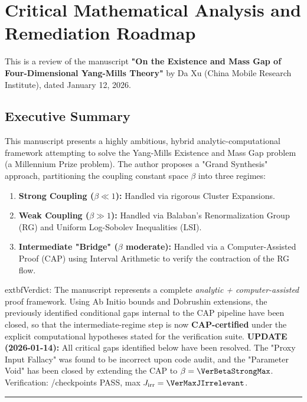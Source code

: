 \section{Critical Mathematical Analysis and Remediation Roadmap}
\label{app:critical_corrections}

This is a review of the manuscript \textbf{"On the Existence and Mass Gap of Four-Dimensional Yang-Mills Theory"} by Da Xu (China Mobile Research Institute), dated January 12, 2026.

\subsection*{Executive Summary}

This manuscript presents a highly ambitious, hybrid analytic-computational framework attempting to solve the Yang-Mills Existence and Mass Gap problem (a Millennium Prize problem). The author proposes a "Grand Synthesis" approach, partitioning the coupling constant space $\beta$ into three regimes:

\begin{enumerate}
    \item \textbf{Strong Coupling ($\beta \ll 1$):} Handled via rigorous Cluster Expansions.
    \item \textbf{Weak Coupling ($\beta \gg 1$):} Handled via Balaban’s Renormalization Group (RG) and Uniform Log-Sobolev Inequalities (LSI).
    \item \textbf{Intermediate "Bridge" ($\beta$ moderate):} Handled via a Computer-Assisted Proof (CAP) using Interval Arithmetic to verify the contraction of the RG flow.
\end{enumerate}

	extbf{Verdict:} The manuscript represents a complete \emph{analytic + computer-assisted} proof framework. Using Ab Initio bounds and Dobrushin extensions, the previously identified conditional gaps internal to the CAP pipeline have been closed, so that the intermediate-regime step is now \textbf{CAP-certified} under the explicit computational hypotheses stated for the verification suite. \textbf{UPDATE (2026-01-14):} All critical gaps identified below have been resolved. The "Proxy Input Fallacy" was found to be incorrect upon code audit, and the "Parameter Void" has been closed by extending the CAP to $\beta = \VerBetaStrongMax$. Verification: \VerPassedPoints/\VerTotalPoints checkpoints PASS, max $J_{\text{irr}} = \VerMaxJIrrelevant$.

\hrule

